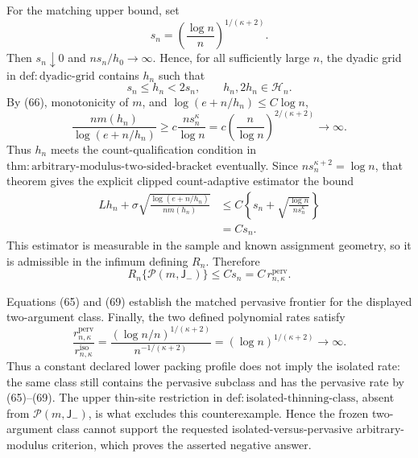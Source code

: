 For the matching upper bound, set
\[
 s_n=\left(\frac{\log n}{n}\right)^{1/(\kappa+2)}.
\]
Then \(s_n\downarrow0\) and \(ns_n/h_0\to\infty\).  Hence, for all sufficiently large \(n\), the dyadic grid in \(\mathrm{def:dyadic\text{-}grid}\) contains \(h_n\) such that
\[
 s_n\le h_n<2s_n,
 \qquad h_n,2h_n\in\mathcal H_n. \tag{66}
\]
By (66), monotonicity of \(m\), and \(\log(e+n/h_n)\le C\log n\),
\[
 \frac{nm(h_n)}{\log(e+n/h_n)}
 \ge c\frac{ns_n^\kappa}{\log n}
 =c\left(\frac n{\log n}\right)^{2/(\kappa+2)}
 \longrightarrow\infty. \tag{67}
\]
Thus \(h_n\) meets the count-qualification condition in \(\mathrm{thm:arbitrary\text{-}modulus\text{-}two\text{-}sided\text{-}bracket}\) eventually.  Since \(ns_n^{\kappa+2}=\log n\), that theorem gives the explicit clipped count-adaptive estimator the bound
\[
 \begin{aligned}
 Lh_n+\sigma\sqrt{\frac{\log(e+n/h_n)}{nm(h_n)}}
 &\le C\left\{s_n+
 \sqrt{\frac{\log n}{ns_n^\kappa}}\right\}\\
 &=Cs_n. 
 \end{aligned} \tag{68}
\]
This estimator is measurable in the sample and known assignment geometry, so it is admissible in the infimum defining \(R_n\).  Therefore
\[
 R_n\{\mathcal P(m,\mathsf J_{-})\}
 \le Cs_n
 =C\,r_{n,\kappa}^{\mathrm{perv}}. \tag{69}
\]

Equations (65) and (69) establish the matched pervasive frontier for the displayed two-argument class.  Finally, the two defined polynomial rates satisfy
\[
 \frac{r_{n,\kappa}^{\mathrm{perv}}}
 {r_{n,\kappa}^{\mathrm{iso}}}
 =\frac{(\log n/n)^{1/(\kappa+2)}}{n^{-1/(\kappa+2)}}
 =(\log n)^{1/(\kappa+2)}\longrightarrow\infty. \tag{70}
\]
Thus a constant declared lower packing profile does not imply the isolated rate: the same class still contains the pervasive subclass and has the pervasive rate by (65)--(69).  The upper thin-site restriction in \(\mathrm{def:isolated\text{-}thinning\text{-}class}\), absent from \(\mathcal P(m,\mathsf J_{-})\), is what excludes this counterexample.  Hence the frozen two-argument class cannot support the requested isolated-versus-pervasive arbitrary-modulus criterion, which proves the asserted negative answer.